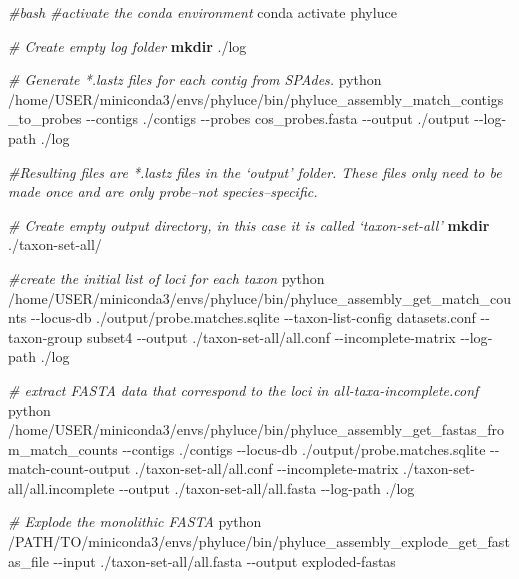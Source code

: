 \documentclass[
  12pt,
]{article}
\newenvironment{Shaded}{\begin{snugshade}}{\end{snugshade}}
\newcommand{\AttributeTok}[1]{\textcolor[rgb]{0.13,0.29,0.53}{#1}}
\newcommand{\CommentTok}[1]{\textcolor[rgb]{0.56,0.35,0.01}{\textit{#1}}}
\newcommand{\ExtensionTok}[1]{#1}
\newcommand{\FunctionTok}[1]{\textcolor[rgb]{0.13,0.29,0.53}{\textbf{#1}}}
\newcommand{\NormalTok}[1]{#1}
\newcommand{\StringTok}[1]{\textcolor[rgb]{0.31,0.60,0.02}{#1}}
\begin{document}
\begin{Shaded}
\begin{Highlighting}[]
\CommentTok{\#bash}
\CommentTok{\#activate the conda environment}
\ExtensionTok{conda}\NormalTok{ activate phyluce}

\CommentTok{\# Create empty log folder}
\FunctionTok{mkdir}\NormalTok{ ./log}

\CommentTok{\# Generate *.lastz files for each contig from SPAdes.}
\ExtensionTok{python}\NormalTok{ /home/USER/miniconda3/envs/phyluce/bin/phyluce\_assembly\_match\_contigs\_to\_probes     }\AttributeTok{{-}{-}contigs}\NormalTok{ ./contigs     }\AttributeTok{{-}{-}probes}\NormalTok{ cos\_probes.fasta     }\AttributeTok{{-}{-}output}\NormalTok{ ./output     }\AttributeTok{{-}{-}log{-}path}\NormalTok{ ./log}

\CommentTok{\#Resulting files are *.lastz files in the ‘output’ folder. These files only need to be made once and are only probe–not species–specific.}

\CommentTok{\# Create empty output directory, in this case it is called ‘taxon{-}set{-}all’}
\FunctionTok{mkdir}\NormalTok{ ./taxon{-}set{-}all/}

\CommentTok{\#create the initial list of loci for each taxon}
\ExtensionTok{python}\NormalTok{ /home/USER/miniconda3/envs/phyluce/bin/phyluce\_assembly\_get\_match\_counts     }\AttributeTok{{-}{-}locus{-}db}\NormalTok{ ./output/probe.matches.sqlite     }\AttributeTok{{-}{-}taxon{-}list{-}config}\NormalTok{ datasets.conf     }\AttributeTok{{-}{-}taxon{-}group} \StringTok{\textquotesingle{}subset4\textquotesingle{}}     \AttributeTok{{-}{-}output}\NormalTok{ ./taxon{-}set{-}all/all.conf     }\AttributeTok{{-}{-}incomplete{-}matrix}     \AttributeTok{{-}{-}log{-}path}\NormalTok{ ./log}

\CommentTok{\# extract FASTA data that correspond to the loci in all{-}taxa{-}incomplete.conf}
\ExtensionTok{python}\NormalTok{ /home/USER/miniconda3/envs/phyluce/bin/phyluce\_assembly\_get\_fastas\_from\_match\_counts  }\AttributeTok{{-}{-}contigs}\NormalTok{ ./contigs   }\AttributeTok{{-}{-}locus{-}db}\NormalTok{ ./output/probe.matches.sqlite }\AttributeTok{{-}{-}match{-}count{-}output}\NormalTok{ ./taxon{-}set{-}all/all.conf }\AttributeTok{{-}{-}incomplete{-}matrix}\NormalTok{ ./taxon{-}set{-}all/all.incomplete }\AttributeTok{{-}{-}output}\NormalTok{ ./taxon{-}set{-}all/all.fasta }\AttributeTok{{-}{-}log{-}path}\NormalTok{ ./log}

\CommentTok{\# Explode the monolithic FASTA}
\ExtensionTok{python}\NormalTok{ /PATH/TO/miniconda3/envs/phyluce/bin/phyluce\_assembly\_explode\_get\_fastas\_file }\AttributeTok{{-}{-}input}\NormalTok{ ./taxon{-}set{-}all/all.fasta }\AttributeTok{{-}{-}output}\NormalTok{ exploded{-}fastas}


\end{Highlighting}
\end{Shaded}
\end{document}

